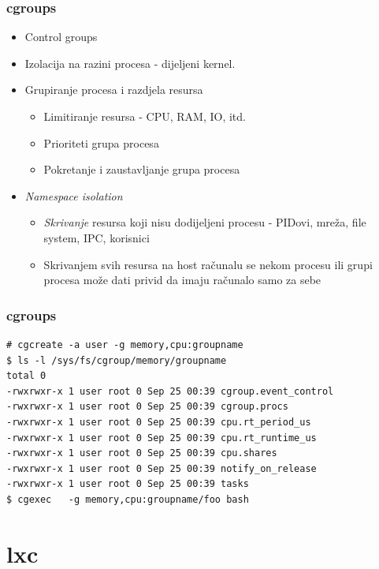 \documentclass[t]{beamer}
\begin{document}
\begin{frame}
	\frametitle{cgroups}
	\begin{itemize}
		\item Control groups
    \item Izolacija na razini procesa - dijeljeni kernel.
	\end{itemize}
	\begin{itemize}
		\item Grupiranje procesa i razdjela resursa
		\begin{itemize}
			\item Limitiranje resursa - CPU, RAM, IO, itd.
			\item Prioriteti grupa procesa
			\item Pokretanje i zaustavljanje grupa procesa
		\end{itemize}
		\item \emph{Namespace isolation}
		\begin{itemize}
			\item \emph{Skrivanje} resursa koji nisu dodijeljeni procesu - PIDovi, mreža, file system, IPC, korisnici
      \item Skrivanjem svih resursa na host računalu se nekom procesu ili grupi procesa može dati privid da imaju računalo samo za sebe
		\end{itemize}
	\end{itemize}
\end{frame}

\begin{frame}[fragile]
	\frametitle{cgroups}
	\scriptsize
	\begin{verbatim}
# cgcreate -a user -g memory,cpu:groupname
$ ls -l /sys/fs/cgroup/memory/groupname
total 0
-rwxrwxr-x 1 user root 0 Sep 25 00:39 cgroup.event_control
-rwxrwxr-x 1 user root 0 Sep 25 00:39 cgroup.procs
-rwxrwxr-x 1 user root 0 Sep 25 00:39 cpu.rt_period_us
-rwxrwxr-x 1 user root 0 Sep 25 00:39 cpu.rt_runtime_us
-rwxrwxr-x 1 user root 0 Sep 25 00:39 cpu.shares
-rwxrwxr-x 1 user root 0 Sep 25 00:39 notify_on_release
-rwxrwxr-x 1 user root 0 Sep 25 00:39 tasks
$ cgexec   -g memory,cpu:groupname/foo bash
	\end{verbatim}

\end{frame}



\section{lxc}
\end{document}
